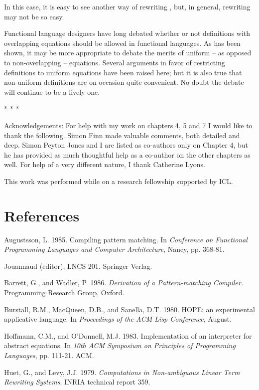 In this case, it is easy to see another way of rewriting , but, in
general, rewriting may not be so easy.

Functional language designers have long debated whether or not
definitions with overlapping equations should be allowed in functional
languages. As has been shown, it may be more appropriate to debate the
merits of uniform -- as opposed to non-overlapping -- equations. Several
arguments in favor of restricting definitions to uniform equations have been
raised here; but it is also true that non-uniform definitions are on occasion
quite convenient. No doubt the debate will continue to be a lively one.

{\footnotesize
\vspace{\baselineskip}
	
{\centering%
	
* \hspace{2cm} * \hspace{2cm} *

}%

\vspace{0.5\baselineskip}

\noindent Acknowledgements: For help with my work on chapters 4, 5 and 7 I would like to
thank the following. Simon Finn made valuable comments, both detailed and deep.
Simon Peyton Jones and I are listed as co-authors only on Chapter 4, but he has
provided as much thoughtful help as a co-author on the other chapters as well. For help
of a very different nature, I thank Catherine Lyons.

This work was performed while on a research fellowship supported by ICL.
}

\section*{References}

\begin{references}
	\item Augustsson, L. 1985. Compiling pattern matching. In \textit{Conference on Functional Programming Languages and Computer Architecture}, Nancy, pp. 368-81.
	\item Jouannaud (editor), LNCS 201. Springer Verlag.
	\item Barrett, G., and Wadler, P. 1986. \textit{Derivation of a Pattern-matching Compiler.} Programming Research Group, Oxford.
	\item Burstall, R.M., MacQueen, D.B., and Sanella, D.T. 1980. HOPE: an experimental applicative language. In \textit{Proceedings of the ACM Lisp Conference}, August.
	\item Hoffmann, C.M., and O'Donnell, M.J. 1983. Implementation of an interpreter for abstract equations. In \textit{10th ACM Symposium on Principles of Programming Languages}, pp. 111-21. ACM.
	\item Huet, G., and Levy, J.J. 1979. \textit{Computations in Non-ambiguous Linear Term Rewriting Systems.} INRIA technical report 359.
\end{references}
